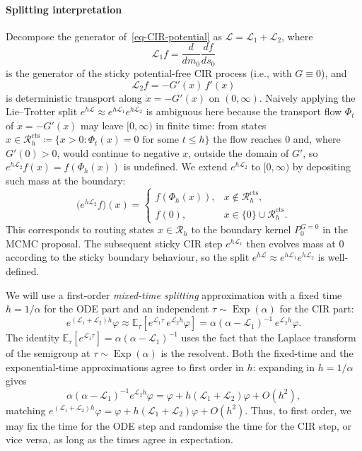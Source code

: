 \documentclass[aap,preprint]{imsart}
\numberwithin{equation}{section}
\theoremstyle{plain}
\theoremstyle{definition}
\begin{document}
\paragraph{Splitting interpretation}
Decompose the generator of~\cref{eq-CIR-potential} as
$\mathcal{L} = \mathcal{L}_1 + \mathcal{L}_2$, where
\[
  \mathcal{L}_1 f = \frac{d}{dm_0}\frac{df}{ds_0}
\]
is the generator of the sticky potential-free CIR process (i.e., with $G \equiv 0$), and
\[
  \mathcal{L}_2 f = -G'(x)\,f'(x)
\]
is deterministic transport along $\dot x = -G'(x)$ on $(0,\infty)$.
Naively applying the Lie--Trotter split $e^{h\mathcal{L}} \approx e^{h\mathcal{L}_1} e^{h\mathcal{L}_2}$ is ambiguous here because the transport flow $\Phi_t$ of $\dot x = -G'(x)$ may leave $[0,\infty)$ in finite time: from states $x \in \mathcal{R}_h^{\mathrm{cts}} \coloneqq \{x > 0 : \Phi_t(x) = 0 \text{ for some } t \leq h\}$ the flow reaches $0$ and, where $G'(0)>0$, would continue to negative $x$, outside the domain of $G'$, so $e^{h\mathcal{L}_2}f(x)=f(\Phi_h(x))$ is undefined. We extend $e^{h\mathcal{L}_2}$ to
$[0,\infty)$ by depositing such mass at the boundary:
\begin{equation}\label{eq:transport-ext}
  \bigl(e^{h\mathcal{L}_2} f\bigr)(x) =
  \begin{cases}
    f(\Phi_h(x)), & x \notin \mathcal{R}_h^{\mathrm{cts}}, \\
    f(0), & x \in \{0\} \cup \mathcal{R}_h^{\mathrm{cts}}.
  \end{cases}
\end{equation}
This corresponds to routing states $x \in \mathcal{R}_h$
to the boundary kernel $P_0^{G=0}$ in the MCMC proposal. The subsequent sticky CIR step
$e^{h\mathcal{L}_1}$ then evolves mass at $0$ according to the sticky
boundary behaviour, so the split $e^{h\mathcal{L}} \approx e^{h\mathcal{L}_1} e^{h\mathcal{L}_2}$ is well-defined. 

We will use a first-order \emph{mixed-time splitting} approximation with a fixed
time $h=1/\alpha$ for the ODE part and an independent
$\tau\sim\operatorname{Exp}(\alpha)$ for the CIR part:
\[
  e^{(\mathcal{L}_1+\mathcal{L}_2)h}\varphi
   \approx 
  \mathbb{E}_\tau\!\left[e^{\mathcal{L}_1\tau}\,e^{\mathcal{L}_2h}\varphi\right]
  = \alpha(\alpha-\mathcal{L}_1)^{-1}\,e^{\mathcal{L}_2h}\varphi.
\]
The identity $\mathbb{E}_\tau[e^{\mathcal{L}_1\tau}] = \alpha(\alpha-\mathcal{L}_1)^{-1}$
uses the fact that the Laplace transform of the semigroup at
$\tau\sim\operatorname{Exp}(\alpha)$ is the resolvent.  Both the fixed-time
and the exponential-time approximations agree to first order in $h$:
expanding in $h=1/\alpha$ gives
\[
  \alpha(\alpha-\mathcal{L}_1)^{-1}e^{\mathcal{L}_2h}\varphi
  = \varphi + h(\mathcal{L}_1+\mathcal{L}_2)\varphi + O(h^2),
\]
matching $e^{(\mathcal{L}_1+\mathcal{L}_2)h}\varphi = \varphi +
h(\mathcal{L}_1+\mathcal{L}_2)\varphi + O(h^2)$.  Thus, to first order, we may fix 
the time for the ODE step and randomise the time for the CIR step, or vice versa, 
as long as the times agree in expectation.
\end{document}
